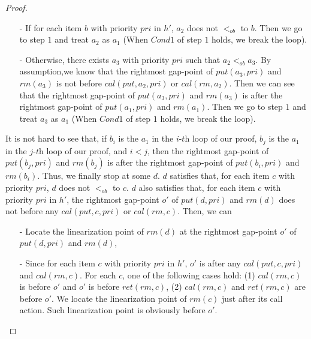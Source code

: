 \begin {proof}
\begin{itemize}
    \begin{itemize}
    \setlength{\itemsep}{0.5pt}
    \item[-] If for each item $b$ with priority $\textit{pri}$ in $h'$, $a_2$ does not $<_{\textit{ob}}$ to $b$. Then we go to step $1$ and treat $a_2$ as $a_1$ (When $\textit{Cond1}$ of step $1$ holds, we break the loop).
    \item[-] Otherwise, there exists $a_3$ with priority $\textit{pri}$ such that $a_2 <_{\textit{ob}} a_3$. By assumption,we know that the rightmost gap-point of $\textit{put}(a_3,\textit{pri})$ and $\textit{rm}(a_3)$ is not before $\textit{cal}(\textit{put},a_2,\textit{pri})$ or $\textit{cal}(\textit{rm},a_2)$. Then we can see that the rightmost gap-point of $\textit{put}(a_3,\textit{pri})$ and $\textit{rm}(a_3)$ is after the rightmost gap-point of $\textit{put}(a_1,\textit{pri})$ and $\textit{rm}(a_1)$. Then we go to step $1$ and treat $a_3$ as $a_1$ (When $\textit{Cond1}$ of step $1$ holds, we break the loop).
    \end{itemize}
\end{itemize}

It is not hard to see that, if $b_i$ is the $a_1$ in the $\textit{i-th}$ loop of our proof, $b_j$ is the $a_1$ in the $\textit{j-th}$ loop of our proof, and $i<j$, then the rightmost gap-point of $\textit{put}(b_j,\textit{pri})$ and $\textit{rm}(b_j)$ is after the rightmost gap-point of $\textit{put}(b_i,\textit{pri})$ and $\textit{rm}(b_i)$. Thus, we finally stop at some $d$. $d$ satisfies that, for each item $c$ with priority $\textit{pri}$, $d$ does not $<_{\textit{ob}}$ to $c$. $d$ also satisfies that, for each item $c$ with priority $\textit{pri}$ in $h'$, the rightmost gap-point $o'$ of $\textit{put}(d,\textit{pri})$ and $\textit{rm}(d)$ does not before any $\textit{cal}(\textit{put},c,\textit{pri})$ or $\textit{cal}(\textit{rm},c)$. Then, we can

\begin{itemize}
\setlength{\itemsep}{0.5pt}
\item[-] Locate the linearization point of $\textit{rm}(d)$ at the rightmost gap-point $o'$ of $\textit{put}(d,\textit{pri})$ and $\textit{rm}(d)$,

\item[-] Since for each item $c$ with priority $\textit{pri}$ in $h'$, $o'$ is after any $\textit{cal}(\textit{put},c,\textit{pri})$ and $\textit{cal}(\textit{rm},c)$. For each $c$, one of the following cases hold: (1) $\textit{cal}(\textit{rm},c)$ is before $o'$ and $o'$ is before $\textit{ret}(\textit{rm},c)$, (2) $\textit{cal}(\textit{rm},c)$ and $\textit{ret}(\textit{rm},c)$ are before $o'$. We locate the linearization point of $\textit{rm}(c)$ just after its call action. Such linearization point is obviously before $o'$.


\end{itemize}
\end{proof}

